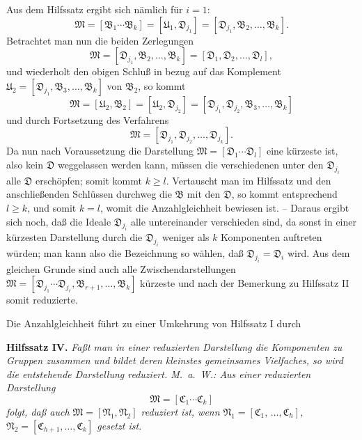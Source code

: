 \documentclass[11pt]{article}
\newcommand{\ideal}[1]{\mathfrak{#1}}
\begin{document}
Aus dem Hilfssatz ergibt sich nämlich für $i=1$:
\[
 \ideal M=[\ideal B_1\cdots\ideal B_k]=[\ideal U_1,\ideal D_{j_1}]
 =[\ideal D_{j_1},\ideal B_2,\ldots,\ideal B_k].
\]
Betrachtet man nun die beiden Zerlegungen
\[
 \ideal M=[\ideal D_{j_1},\ideal B_2,\ldots,\ideal B_k]
          =[\ideal D_1,\ideal D_2,\ldots,\ideal D_l],
\]
und wiederholt den obigen Schluß in bezug auf das Komplement $\ideal U_2=[\ideal D_{j_1},\ideal B_3,\ldots,\ideal B_k]$ von $\ideal B_2$, so kommt
\[
 \ideal M=[\ideal U_2,\ideal B_2]=[\ideal U_2,\ideal D_{j_2}]
          =[\ideal D_{j_1},\ideal D_{j_2},\ideal B_3,\ldots,\ideal B_k]
\]
und durch Fortsetzung des Verfahrens
\[
 \ideal M=[\ideal D_{j_1},\ideal D_{j_2},\ldots,\ideal D_{j_k}].
\]
Da nun nach Voraussetzung die Darstellung $\ideal M=[\ideal D_1\cdots\ideal D_l]$ eine kürzeste ist, also kein $\ideal D$ weggelassen werden kann, müssen die verschiedenen unter den $\ideal D_{j_i}$ alle $\ideal D$ erschöpfen; somit kommt $k\ge l$. Vertauscht man im Hilfssatz und den anschließenden Schlüssen durchweg die $\ideal B$ mit den $\ideal D$, so kommt entsprechend $l\ge k$, und somit $k=l$, womit die Anzahlgleichheit bewiesen ist. -- Daraus ergibt sich noch, daß die Ideale $\ideal D_{j_i}$ alle untereinander verschieden sind, da sonst in einer kürzesten Darstellung durch die $\ideal D_{j_i}$ weniger als $k$ Komponenten auftreten würden; man kann also die Bezeichnung so wählen, daß $\ideal D_{j_i}=\ideal D_i$ wird. Aus dem gleichen Grunde sind auch alle Zwischendarstellungen $\ideal M=[\ideal D_{j_1}\cdots\ideal D_{j_r},\ideal B_{r+1},\ldots,\ideal B_k]$ kürzeste und nach der Bemerkung zu Hilfssatz II somit reduzierte.

Die Anzahlgleichheit führt zu einer Umkehrung von Hilfssatz I durch

\textbf{Hilfssatz IV.} \emph{Faßt man in einer reduzierten Darstellung die Komponenten zu Gruppen zusammen und bildet deren kleinstes gemeinsames Vielfaches, so wird die entstehende Darstellung reduziert. M.~a.~W.: Aus einer reduzierten Darstellung}
\[
 \ideal M=[\ideal C_1\cdots\ideal C_k]
\]
\emph{folgt, daß auch $\ideal M=[\ideal N_1,\ideal N_2]$ reduziert ist, wenn $\ideal N_1=[\ideal C_1,\,\ldots,\ideal C_h]$, $\ideal N_2=[\ideal C_{h+1},\ldots,\ideal C_k]$ gesetzt ist.}
\end{document}
